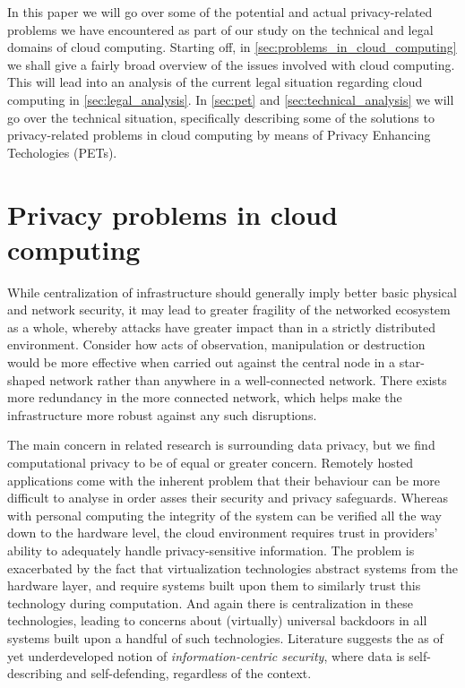 \documentclass[12pt]{article}
\begin{document}
In this paper we will go over some of the potential and actual privacy-related problems we have encountered as part of our study on the technical and legal domains of cloud computing. Starting off, in \autoref{sec:problems_in_cloud_computing} we shall give a fairly broad overview of the issues involved with cloud computing.
This will lead into an analysis of the current legal situation regarding cloud computing in \autoref{sec:legal_analysis}. In \autoref{sec:pet} and \autoref{sec:technical_analysis} we will go over the technical situation, specifically describing some of the solutions to privacy-related problems in cloud computing by means of Privacy Enhancing Techologies (PETs).

\section{Privacy problems in cloud computing}
\label{sec:problems_in_cloud_computing}

While centralization of infrastructure should generally imply better basic physical and network security, it may lead to greater fragility of the networked ecosystem as a whole, whereby attacks have greater impact than in a strictly distributed environment.
Consider how acts of observation, manipulation or destruction would be more effective when carried out against the central node in a star-shaped network rather than anywhere in a well-connected network.
There exists more redundancy in the more connected network, which helps make the infrastructure more robust against any such disruptions.

The main concern in related research is surrounding data privacy, but we find computational privacy to be of equal or greater concern.
Remotely hosted applications come with the inherent problem that their behaviour can be more difficult to analyse in order asses their security and privacy safeguards.
Whereas with personal computing the integrity of the system can be verified all the way down to the hardware level, the cloud environment requires trust in providers' ability to adequately handle privacy-sensitive information.
The problem is exacerbated by the fact that virtualization technologies abstract systems from the hardware layer, and require systems built upon them to similarly trust this technology during computation.
And again there is centralization in these technologies, leading to concerns about (virtually) universal backdoors in all systems built upon a handful of such technologies.
Literature suggests the as of yet underdeveloped notion of \textit{information-centric security}, where data is self-describing and self-defending, regardless of the context. \cite{chow2009controlling}
\end{document}
